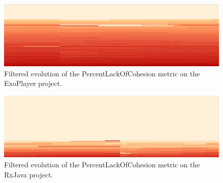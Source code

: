 \begin{figure}[H]
  \centering
  \includegraphics[width=1.0\textwidth]{figures/spectro_lack_exo.png}
  \caption{Filtered evolution of the PercentLackOfCohesion metric on the ExoPlayer project.}
  \label{fig:spectro_lack_exo}
\end{figure}

\begin{figure}[H]
  \centering
  \includegraphics[width=1.0\textwidth]{figures/spectro_lack_rxjava.png}
  \caption{Filtered evolution of the PercentLackOfCohesion metric on the RxJava project.}
  \label{fig:spectro_lack_rxjava}
\end{figure}
